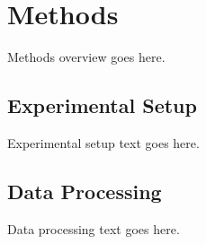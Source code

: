 \section{Methods}
\label{sec:methods}


Methods overview goes here.

\subsection{Experimental Setup}
\label{sec:experimental-setup}


Experimental setup text goes here.

\subsection{Data Processing}
\label{sec:data-processing}


Data processing text goes here.
